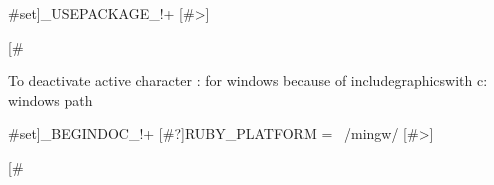 {#set]_USEPACKAGE_!+
[#>]\usepackage[french]{babel}
[#}

To deactivate active character : for windows because of includegraphicswith c: windows path

{#set]_BEGINDOC_!+
[#?]RUBY_PLATFORM =~ /mingw/
[#>]
\shorthandoff{:}

[#}


